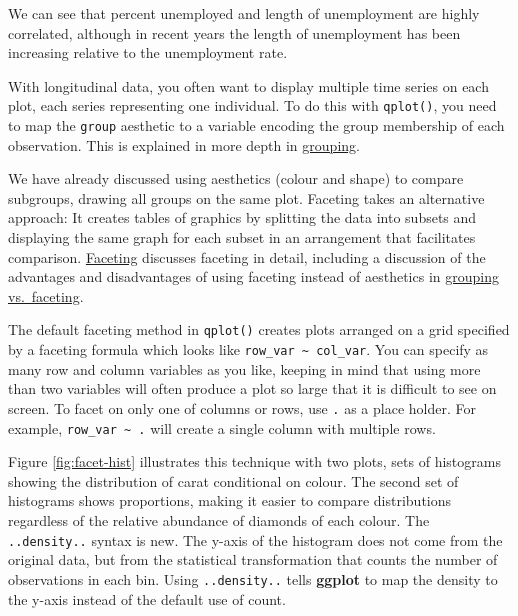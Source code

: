 We can see that percent unemployed and length of unemployment are highly
correlated, although in recent years the length of unemployment has been
increasing relative to the unemployment rate.

With longitudinal data, you often want to display multiple time series
on each plot, each series representing one individual. To do this with
\texttt{qplot()}, you need to map the \texttt{group} aesthetic to a
variable encoding the group membership of each observation. This is
explained in more depth in \hyperref[sub:grouping]{grouping}.
 


We have already discussed using aesthetics (colour and shape) to compare
subgroups, drawing all groups on the same plot. Faceting takes an
alternative approach: It creates tables of graphics by splitting the
data into subsets and displaying the same graph for each subset in an
arrangement that facilitates comparison.
\hyperref[sec:faceting]{Faceting} discusses faceting in detail,
including a discussion of the advantages and disadvantages of using
faceting instead of aesthetics in \hyperref[sub:group-vs-facet]{grouping
vs.~faceting}. 

The default faceting method in \texttt{qplot()} creates plots arranged
on a grid specified by a faceting formula which looks like
\texttt{row\_var \textasciitilde{} col\_var}. You can specify as many
row and column variables as you like, keeping in mind that using more
than two variables will often produce a plot so large that it is
difficult to see on screen. To facet on only one of columns or rows, use
\texttt{.} as a place holder. For example,
\texttt{row\_var \textasciitilde{} .} will create a single column with
multiple rows. 

Figure \ref{fig:facet-hist} illustrates this technique with two plots,
sets of histograms showing the distribution of carat conditional on
colour. The second set of histograms shows proportions, making it easier
to compare distributions regardless of the relative abundance of
diamonds of each colour. The \texttt{..density..} syntax is new. The
y-axis of the histogram does not come from the original data, but from
the statistical transformation that counts the number of observations in
each bin. Using \texttt{..density..} tells \textbf{ggplot} to map the
density to the y-axis instead of the default use of count.

